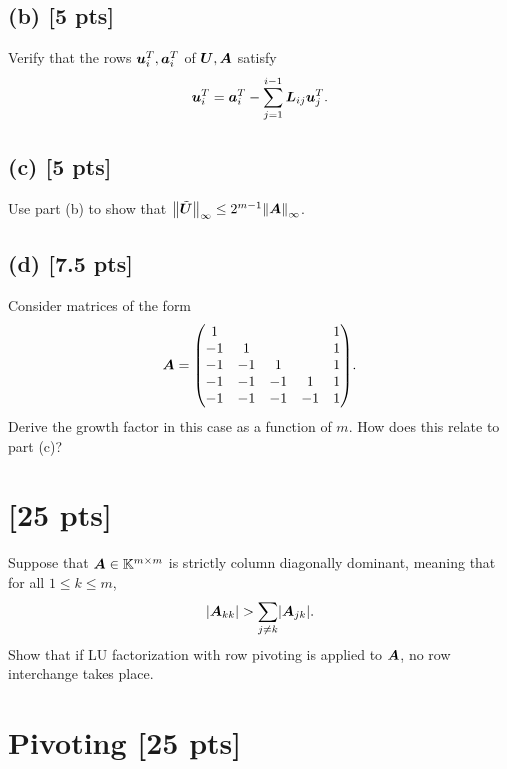 \documentclass[twoside,10pt]{article}
\begin{document}
\subsection*{(b) [5 pts]}
Verify that the rows $\bm{u}_{i}^{T}, \bm{a}_{i}^{T}$ of $\bm{U}, \bm{A}$ satisfy 
\begin{equation}
  \bm{u}_{i}^{T} = \bm{a}_i^T - \sum \limits_{j = 1}^{i - 1} \bm{L}_{ij} \bm{u}_{j}^T.
\end{equation}

\subsection*{(c) [5 pts]}
Use part (b) to show that $\left\|\tilde{\mtx{U}}\right\|_{\infty} \leq 2^{m - 1} \left\| \mtx{A}\right\|_{\infty}$. 

\subsection*{(d) [7.5 pts]} Consider matrices of the form 
\begin{equation}
  \mtx{A} = 
  \begin{pmatrix}
    1  &    &   &       & 1 \\
    -1 & 1  &   &       & 1 \\
    -1 & -1 & 1 &       & 1 \\
    -1 & -1 & -1 &    1 & 1 \\
    -1 & -1 & -1 &  - 1 & 1 
  \end{pmatrix}.
\end{equation}
Derive the growth factor in this case as a function of $m$. 
How does this relate to part (c)? 

\section{[25 pts]}
Suppose that $\bm{A} \in \mathbb{K}^{m \times m}$ is strictly column diagonally dominant, meaning that for all $1 \leq k \leq m$, 
\begin{equation}
  \left|\mtx{A}_{kk}\right| > \sum \limits_{j \neq k} \left|\mtx{A}_{jk}\right|.
\end{equation}
Show that if LU factorization with row pivoting is applied to $\bm{A}$, no row interchange takes place.

\section{Pivoting [25 pts]}
\end{document}
